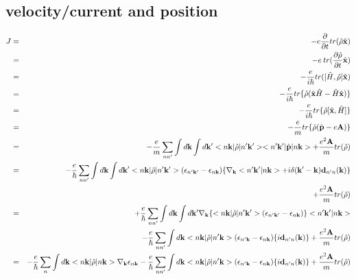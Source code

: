 \documentclass[aps,prb,preprint]{revtex4-1}
\begin{document}
\begin{appendix}
\section{velocity/current and position}
\begin{eqnarray}
J &=&  -e\frac{\partial}{\partial t} tr(\hat{\rho}\hat{\bf x}) \nonumber \\
&=&  -e\: tr(\frac{\partial \hat{\rho} }{\partial t}\hat{\bf x}) \nonumber \\
&=&  -\frac{e}{i \hbar} tr([\hat{H}, \hat{\rho}] \hat{\bf x}) \nonumber \\
&=&  -\frac{e}{i \hbar} tr\{\hat{\rho}(\hat{\bf x}\hat{H}-\hat{H}\hat{\bf x})\} \nonumber \\
&=&  -\frac{e}{i \hbar} tr\{\hat{\rho}[\hat{\bf x},\hat{H}]\} \nonumber \\
&=&  -\frac{e}{m} tr\{\hat{\rho}(\hat{\bf p}-e{\bf A})\} \nonumber \\
&=&   - \frac{e}{m} \sum_{nn'}\int d{\bf k} \int d{\bf k'} <n{\bf k}|\hat{\rho}|n'{\bf k'}><n'{\bf k'}|\hat{\bf p}|n{\bf k}> +\frac{e^2{\bf A}}{m}tr(\hat{\rho}) \nonumber \\
&=&   -\frac{e}{\hbar} \sum_{nn'} \int d{\bf k}\int d{\bf k'} <n{\bf k}|\hat{\rho}|n'{\bf k'}> (\epsilon_{n'{\bf k'}}-\epsilon_{n{\bf k}})\{\nabla_{\bf k} <n'{\bf k'}|n{\bf k}> + i \delta({\bf k'-k}) {\bf d}_{n'n}({\bf k})\}  \nonumber \\
&& + \frac{e^2{\bf A}}{m}tr(\hat{\rho}) \nonumber \\
&=&   +\frac{e}{\hbar} \sum_{nn'} \int d{\bf k}\int d{\bf k'} \nabla_{\bf k}\{<n{\bf k}|\hat{\rho}|n'{\bf k'}> (\epsilon_{n'{\bf k'}}-\epsilon_{n{\bf k}})\} <n'{\bf k'}|n{\bf k}>   \nonumber \\
&&   -\frac{e}{\hbar} \sum_{nn'} \int d{\bf k} <n{\bf k}|\hat{\rho}|n'{\bf k}> (\epsilon_{n'{\bf k}}-\epsilon_{n{\bf k}}) \{i {\bf d}_{n'n}({\bf k})\}  + \frac{e^2{\bf A}}{m}tr(\hat{\rho}) \nonumber \\
&=&  -\frac{e}{\hbar} \sum_{n} \int d{\bf k} <n{\bf k}|\hat{\rho}|n{\bf k}> \nabla_{\bf k} \epsilon_{n{\bf k}}  -\frac{e}{\hbar} \sum_{nn'} \int d{\bf k} <n{\bf k}|\hat{\rho}|n'{\bf k}> (\epsilon_{n'{\bf k}}-\epsilon_{n{\bf k}}) \{i {\bf d}_{n'n}({\bf k})\}  + \frac{e^2{\bf A}}{m}tr(\hat{\rho}) \nonumber \\
\end{eqnarray} 


\end{appendix}
\end{document}
